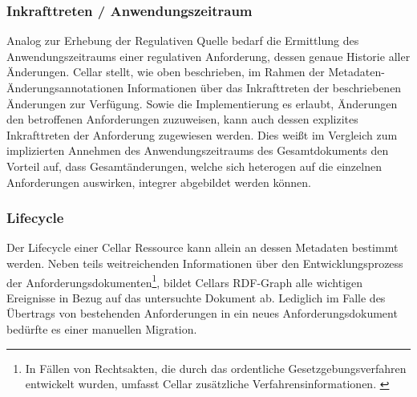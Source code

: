 \subsubsection{Inkrafttreten / Anwendungszeitraum}

Analog zur Erhebung der Regulativen Quelle bedarf die Ermittlung des Anwendungszeitraums einer regulativen Anforderung, dessen genaue Historie aller Änderungen.
Cellar stellt, wie oben beschrieben, im Rahmen der Metadaten-Änderungsannotationen Informationen über das Inkrafttreten der beschriebenen Änderungen zur Verfügung.
Sowie die Implementierung es erlaubt, Änderungen den betroffenen Anforderungen zuzuweisen, kann auch dessen explizites Inkrafttreten der Anforderung zugewiesen werden.
Dies weißt im Vergleich zum implizierten Annehmen des Anwendungszeitraums des Gesamtdokuments den Vorteil auf, dass Gesamtänderungen, welche sich heterogen auf die einzelnen Anforderungen auswirken, integrer abgebildet werden können.

\subsubsection{Lifecycle}

Der Lifecycle einer Cellar Ressource kann allein an dessen Metadaten bestimmt werden.
Neben teils weitreichenden Informationen über den Entwicklungsprozess der Anforderungsdokumenten\footnote{In Fällen von Rechtsakten, die durch das ordentliche Gesetzgebungsverfahren entwickelt wurden, umfasst Cellar zusätzliche Verfahrensinformationen. \cite[vgl.][]{2004R0552}}, bildet Cellars RDF-Graph alle wichtigen Ereignisse in Bezug auf das untersuchte Dokument ab.  
Lediglich im Falle des Übertrags von bestehenden Anforderungen in ein neues Anforderungsdokument bedürfte es einer manuellen Migration.

